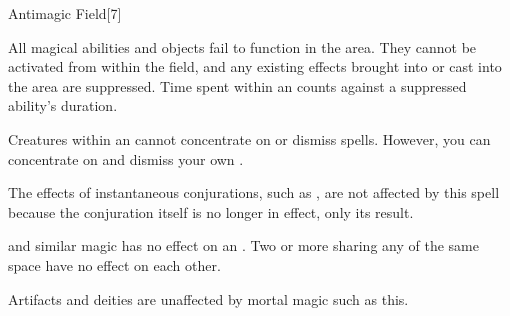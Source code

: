 \begin{spellsection}{Antimagic Field}[7]
    \begin{spellheader}
    \end{spellheader}
    \begin{spellcontent}
        \begin{spelltargetinginfo}
        \end{spelltargetinginfo}
        \begin{spelleffects}
            \spelleffect All magical abilities and objects fail to function in the area. They cannot be activated from within the field, and any existing effects brought into or cast into the area are suppressed. Time spent within an  counts against a suppressed ability's duration.
            \par Creatures within an  cannot concentrate on or dismiss spells. However, you can concentrate on and dismiss your own .
            \spelldur \durshort
        \end{spelleffects}
    \end{spellcontent}
    \begin{spellfooter}
        \spellnotes The effects of instantaneous conjurations, such as , are not affected by this spell because the conjuration itself is no longer in effect, only its result.

        \par {} and similar magic has no effect on an . Two or more  sharing any of the same space have no effect on each other.
        \par Artifacts and deities are unaffected by mortal magic such as this.
        \miscastexplode
    \end{spellfooter}
    \begin{spellaugments}
    \end{spellaugments}
\end{spellsection}

